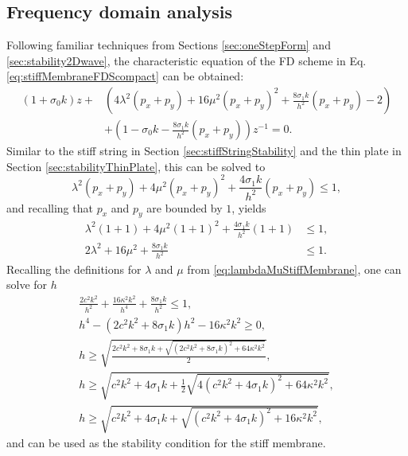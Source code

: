 {\subsection{Frequency domain analysis}\label{sec:stabilityStiffMembrane}
Following familiar techniques from Sections \ref{sec:oneStepForm} and \ref{sec:stability2Dwave}, the characteristic equation of the FD scheme in Eq. \eqref{eq:stiffMembraneFDScompact} can be obtained:
\begin{equation}
    \begin{aligned}
        (1+\sigma_0k)z + &\left(4\lambda^2 (p_x+p_y) + 16\mu^2(p_x+p_y)^2 + \frac{8\sigma_1k}{h^2}(p_x+p_y) - 2\right) \\
        &+ \left(1 - \sigma_0k - \frac{8\sigma_1k}{h^2}(p_x+p_y)\right)z^{-1} = 0.
    \end{aligned}
\end{equation}
Similar to the stiff string in Section \ref{sec:stiffStringStability} and the thin plate in Section \ref{sec:stabilityThinPlate}, this can be solved to 
\begin{equation*}
    \lambda^2(p_x+p_y) + 4\mu^2(p_x+p_y)^2 + \frac{4\sigma_1k}{h^2}(p_x+p_y) \leq 1,
\end{equation*}
and recalling that $p_x$ and $p_y$ are bounded by $1$, yields
\begin{align*}
    \lambda^2(1 + 1) + 4\mu^2(1+1)^2 + \frac{4\sigma_1k}{h^2}(1+1) &\leq 1,\\
    2\lambda^2 + 16\mu^2 + \frac{8\sigma_1k}{h^2} &\leq 1 .
\end{align*}
Recalling the definitions for $\lambda$ and $\mu$ from \ref{eq:lambdaMuStiffMembrane}, one can solve for $h$ 
\begin{gather}
    \frac{2c^2k^2}{h^2}+ \frac{16\kappa^2k^2}{h^4} + \frac{8\sigma_1k}{h^2} \leq 1,\nonumber\\
    h^4 - (2c^2k^2 + 8\sigma_1k)h^2 - 16\kappa^2k^2 \geq 0,\nonumber\\
    h\geq \sqrt{\frac{2c^2k^2 + 8\sigma_1k+\sqrt{(2c^2k^2 + 8\sigma_1k)^2 + 64\kappa^2k^2}}{2}},\nonumber \\
    h\geq \sqrt{c^2k^2 + 4\sigma_1k+\frac{1}{2}\sqrt{4(c^2k^2 + 4\sigma_1k)^2 + 64\kappa^2k^2}},\nonumber\\
    h\geq \sqrt{c^2k^2 + 4\sigma_1k+\sqrt{(c^2k^2 + 4\sigma_1k)^2 + 16\kappa^2k^2}},
\end{gather}
and can be used as the stability condition for the stiff membrane. 
}
